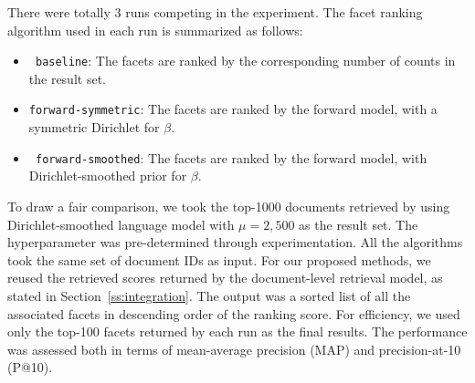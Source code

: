 There were totally 3 runs competing in the experiment.  The facet ranking
algorithm used in each run is summarized as follows: \begin{itemize} \item {\tt
baseline}:  The facets are ranked by the corresponding number of counts in the
result set.  \item {\tt forward-symmetric}:  The facets are ranked by the
forward model, with a symmetric Dirichlet for $\beta$.  \item {\tt
forward-smoothed}:  The facets are ranked by the forward model, with
Dirichlet-smoothed prior for $\beta$.  \end{itemize}

To draw a fair comparison, we took the top-1000 documents retrieved by using
Dirichlet-smoothed language model with $\mu = 2,500$ as the result set.  The
hyperparameter was pre-determined through experimentation.  All the algorithms took the
same set of document IDs as input.  For our proposed methods, we reused
the retrieved scores returned by the document-level retrieval model, as
stated in Section~\ref{ss:integration}.  The output was a sorted list of all the
associated facets in descending order of the ranking score.  For efficiency, we
used only the top-100 facets returned by each run as the final results.  The
performance was assessed both in terms of mean-average precision (MAP) and
precision-at-10 (P@10).  


